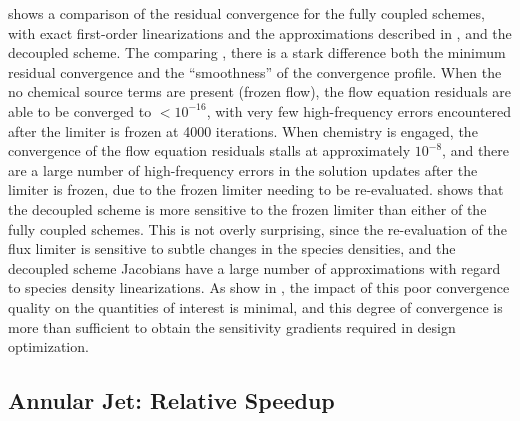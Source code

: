  shows a comparison of the residual convergence for the
fully coupled schemes, with exact first-order linearizations and the
approximations described in , and
the decoupled scheme.  The comparing
, there is a stark
difference both the minimum residual convergence and the ``smoothness'' of the
convergence profile.  When the no chemical source terms are present (frozen
flow), the flow equation residuals are able to be converged to $ < 10^{-16}$,
with very few high-frequency errors encountered after the limiter is frozen at
4000 iterations.  When chemistry is engaged, the convergence of the flow
equation residuals stalls at approximately $10^{-8}$, and there are a large
number of high-frequency errors in the solution updates after the limiter is
frozen, due to the frozen limiter needing to be re-evaluated.
 shows that the decoupled scheme is more
sensitive to the frozen limiter than either of the fully coupled schemes.  This
is not overly surprising, since the re-evaluation of the flux limiter is
sensitive to subtle changes in the species densities, and the decoupled
scheme Jacobians have a large number of approximations with regard to species
density linearizations.  As show in , the
impact of this poor convergence quality on the quantities of interest is
minimal, and this degree of convergence is more than sufficient to obtain the
sensitivity gradients required in design optimization.

\subsection{Annular Jet: Relative Speedup}

